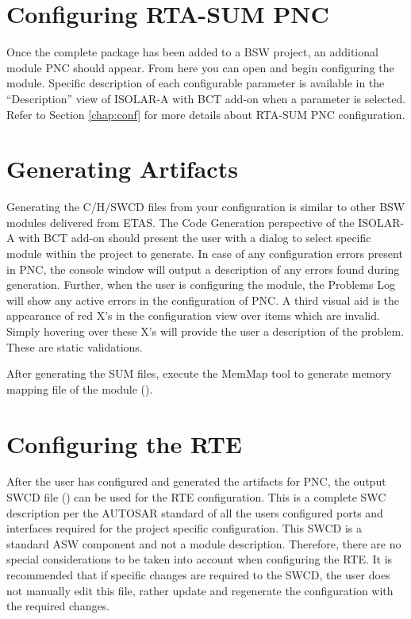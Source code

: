 \section{Configuring RTA-SUM PNC}
Once the complete package has been added to a BSW project, an additional module PNC should
appear. From here you can open and begin configuring the module. Specific description of each
configurable parameter is available in the “Description” view of 
\ifnum {}
\else
{ISOLAR-A with BCT add-on}
\fi
when a parameter is selected.
Refer to Section \ref{chap:conf} for more details about RTA-SUM PNC configuration.

\section{Generating Artifacts}
\label{sec:Artifacts}

Generating the C/H/SWCD files from your configuration is similar to other BSW modules delivered
from ETAS. The Code Generation perspective of the 
\ifnum {}
\else
{ISOLAR-A with BCT add-on}
\fi
should present the user with a dialog
to select specific module within the project to generate. 
\ifnum {}
\fi
In case of any configuration errors present in PNC, the
console window will output a description of any errors found during generation. Further, when the
user is configuring the module, the Problems Log will show any active errors in the configuration of
PNC. A third visual aid is the appearance of red X’s in the configuration view over items which are
invalid. Simply hovering over these X’s will provide the user a description of the problem. These are
static validations.

After generating the SUM files, execute the MemMap tool to generate memory mapping file of the module ().

\section{Configuring the RTE}

After the user has configured and generated the artifacts for PNC, the output SWCD file \linebreak() can be used for the RTE configuration.
This is a complete SWC description per the AUTOSAR standard of all the users configured ports and interfaces required for the project specific configuration.
This SWCD is a standard ASW component and not a module description.
Therefore, there are no special considerations to be taken into account when configuring the RTE.
It is recommended that if specific changes are required to the SWCD, the user does not manually edit this file, rather update and regenerate the configuration with the required changes.

